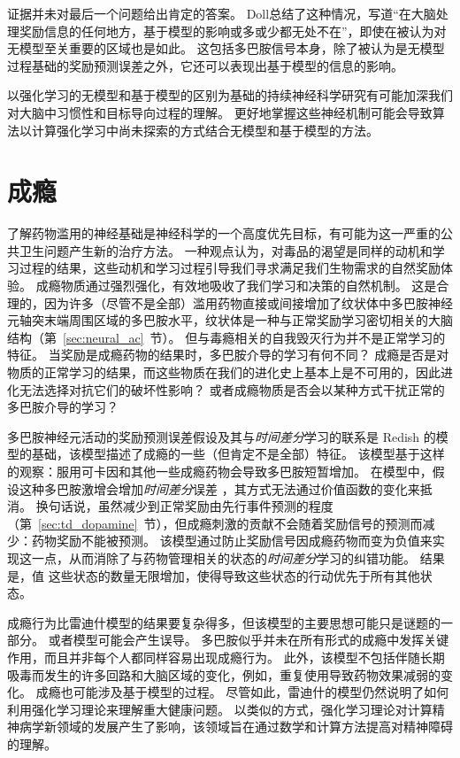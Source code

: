 证据并未对最后一个问题给出肯定的答案。
Doll\cite{doll2012ubiquity}总结了这种情况，写道“在大脑处理奖励信息的任何地方，基于模型的影响或多或少都无处不在”，即使在被认为对无模型至关重要的区域也是如此。
这包括多巴胺信号本身，除了被认为是无模型过程基础的奖励预测误差之外，它还可以表现出基于模型的信息的影响。


以强化学习的无模型和基于模型的区别为基础的持续神经科学研究有可能加深我们对大脑中习惯性和目标导向过程的理解。
更好地掌握这些神经机制可能会导致算法以计算强化学习中尚未探索的方式结合无模型和基于模型的方法。


\section{成瘾}


了解药物滥用的神经基础是神经科学的一个高度优先目标，有可能为这一严重的公共卫生问题产生新的治疗方法。
一种观点认为，对毒品的渴望是同样的动机和学习过程的结果，这些动机和学习过程引导我们寻求满足我们生物需求的自然奖励体验。
成瘾物质通过强烈强化，有效地吸收了我们学习和决策的自然机制。
这是合理的，因为许多（尽管不是全部）滥用药物直接或间接增加了纹状体中多巴胺神经元轴突末端周围区域的多巴胺水平，纹状体是一种与正常奖励学习密切相关的大脑结构（第~\ref{sec:neural_ac}~节）。
但与毒瘾相关的自我毁灭行为并不是正常学习的特征。
当奖励是成瘾药物的结果时，多巴胺介导的学习有何不同？
成瘾是否是对物质的正常学习的结果，而这些物质在我们的进化史上基本上是不可用的，因此进化无法选择对抗它们的破坏性影响？
或者成瘾物质是否会以某种方式干扰正常的多巴胺介导的学习？


多巴胺神经元活动的奖励预测误差假设及其与\textit{时间差分}学习的联系是 Redish\cite{redish2004addiction} 的模型的基础，该模型描述了成瘾的一些（但肯定不是全部）特征。
该模型基于这样的观察：服用可卡因和其他一些成瘾药物会导致多巴胺短暂增加。
在模型中，假设这种多巴胺激增会增加\textit{时间差分}误差 ，其方式无法通过价值函数的变化来抵消。
换句话说，虽然减少到正常奖励由先行事件预测的程度（第~\ref{sec:td_dopamine}~节），但成瘾刺激的贡献不会随着奖励信号的预测而减少：药物奖励不能被预测。
该模型通过防止奖励信号因成瘾药物而变为负值来实现这一点，从而消除了与药物管理相关的状态的\textit{时间差分}学习的纠错功能。
结果是，值 这些状态的数量无限增加，使得导致这些状态的行动优先于所有其他状态。


成瘾行为比雷迪什模型的结果要复杂得多，但该模型的主要思想可能只是谜题的一部分。
或者模型可能会产生误导。
多巴胺似乎并未在所有形式的成瘾中发挥关键作用，而且并非每个人都同样容易出现成瘾行为。
此外，该模型不包括伴随长期吸毒而发生的许多回路和大脑区域的变化，例如，重复使用导致药物效果减弱的变化。
成瘾也可能涉及基于模型的过程。
尽管如此，雷迪什的模型仍然说明了如何利用强化学习理论来理解重大健康问题。
以类似的方式，强化学习理论对计算精神病学新领域的发展产生了影响，该领域旨在通过数学和计算方法提高对精神障碍的理解。


